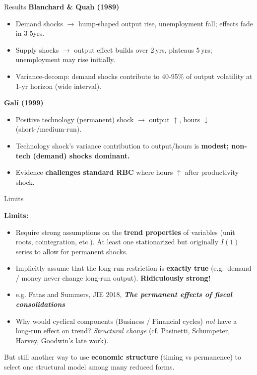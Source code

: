 \documentclass{beamer}
\begin{document}
\begin{frame}{Results}
\small
\textbf{Blanchard \& Quah (1989)}  
\begin{itemize}
  \item Demand shocks $\rightarrow$ hump‐shaped output rise, unemployment fall; effects fade in 3-5yrs.  
  \item Supply shocks $\rightarrow$ output effect builds over 2 yrs, plateaus 5 yrs; unemployment may rise initially.  
  \item Variance‐decomp: demand shocks contribute to 40-95\% of output volatility at 1-yr horizon (wide interval).  
\end{itemize}

\medskip

\textbf{Galí (1999)}  
\begin{itemize}
  \item Positive technology (permanent) shock $\rightarrow$ output $\uparrow$, hours $\downarrow$ (short‐/medium‐run).  
  \item Technology shock’s variance contribution to output/hours is\textbf{ modest; non‐tech (demand) shocks dominant.  }
  \item Evidence \textbf{challenges standard RBC} where hours $\uparrow$ after productivity shock.  
\end{itemize}
\end{frame}


\begin{frame}{Limits}
\small

\textbf{Limits:}
\begin{itemize}
  \item Require strong assumptions on the \textbf{trend properties} of variables
        (unit roots, cointegration, etc.). At least one stationarized but originally $I(1)$ series to allow for permanent shocks.
  \item Implicitly assume that the long-run restriction is \textbf{exactly true}
        (e.g.\ demand / money never change long-run output). \textbf{Ridiculously strong!}
        \item e.g. Fatas and Summers, JIE 2018, \textbf{\textit{The permanent effects of fiscal consolidations}}
        \item Why would cyclical components (Business / Financial cycles) \textit{not} have a long-run effect on trend? \textit{Structural change} (cf. Pasinetti, Schumpeter, Harvey, Goodwin's late work).

\end{itemize}

\medskip
But still another way to use \textbf{economic structure} (timing vs permanence) to select one structural model among many reduced forms.
\end{frame}
\end{document}
